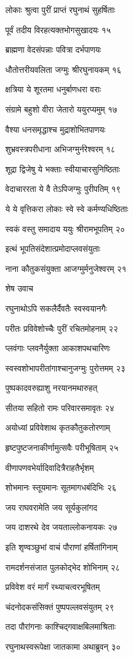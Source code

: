 लोकाः श्रुत्वा पुरीं प्राप्तं रघुनाथं सुहर्षिताः

पूर्वं तदीय विरहत्यक्तभोगसुखादयः १५

ब्राह्मणा वेदसंपन्नाः पवित्रा दर्भपाणयः

धौतोत्तरीयवलिता जग्मुः श्रीरघुनायकम् १६

क्षत्रिया ये शूरतमा धनुर्बाणधरा वराः

संग्रामे बहुशो वीरा जेतारो ययुरप्यमुम् १७

वैश्या धनसमृद्धाश्च मुद्राशोभितपाणयः

शुभ्रवस्त्रपरीधाना अभिजग्मुर्नरेश्वरम् १८

शूद्रा द्विजेषु ये भक्ताः स्वीयाचारसुनिष्ठिताः

वेदाचाररता ये वै तेऽपिजग्मुः पुरीपतिम् १९

ये ये वृत्तिकरा लोकाः स्वे स्वे कर्मण्यधिष्ठिताः

स्वकं वस्तु समादाय ययुः श्रीरामभूपतिम् २०

इत्थं भूपतिसंदेशात्प्रमोदाप्लवसंयुताः

नाना कौतुकसंयुक्ता आजग्मुर्मनुजेश्वरम् २१

शेष उवाच

रघुनाथोऽपि सकलैर्दैवतैः स्वस्वयानगैः

परीतः प्रविवेशोच्चैः पुरीं रचितमोहनाम् २२

प्लवंगाः प्लवनैर्युक्ता आकाशपथचारिणः

स्वस्वशोभापरीतांगाश्चानुजग्मुः पुरोत्तमम् २३

पुष्पकादवरुह्याशु नरयानमथारुहत्

सीतया सहितो रामः परिवारसमावृतः २४

अयोध्यां प्रविवेशाथ कृतकौतुकतोरणाम्

हृष्टपुष्टजनाकीर्णामुत्सवैः परीभूषिताम् २५

वीणापणवभेर्यादिवादित्रैराहतैर्भृशम्

शोभमानः स्तूयमानः सूतमागधबंदिभिः २६

जय राघवरामेति जय सूर्यकुलांगद

जय दाशरथे देव जयताल्लोकनायकः २७

इति शृण्वञ्छुभां वाचं पौराणां हर्षितांगिनाम्

रामदर्शनसंजात पुलकोद्भेद शोभिनाम् २८

प्रविवेश वरं मार्गं रथ्याचत्वरभूषितम्

चंदनोदकसंसिक्तं पुष्पपल्लवसंयुतम् २९

तदा पौरांगनाः काश्चिद्गवाक्षबिलमाश्रिताः

रघुनाथस्वरूपेक्षा जातकामा अथाब्रुवन् ३०

